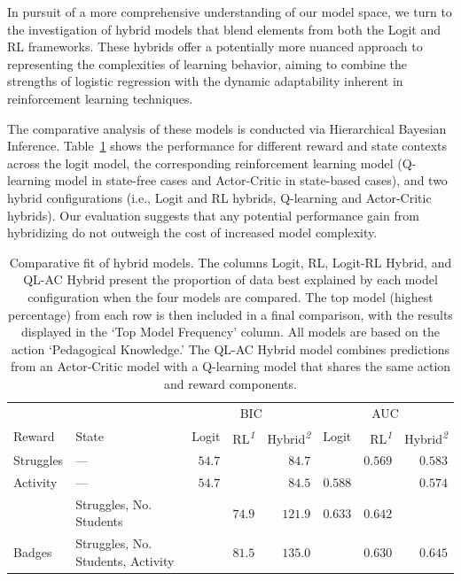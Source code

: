 \documentclass[
  number,
  preprint,
  3p,
  onecolumn]{elsarticle}
\begin{document}
In pursuit of a more comprehensive understanding of our model space, we
turn to the investigation of hybrid models that blend elements from both
the Logit and RL frameworks. These hybrids offer a potentially more
nuanced approach to representing the complexities of learning behavior,
aiming to combine the strengths of logistic regression with the dynamic
adaptability inherent in reinforcement learning techniques.

The comparative analysis of these models is conducted via Hierarchical
Bayesian Inference. Table~\ref{tbl-CBM-second} shows the performance for
different reward and state contexts across the logit model, the
corresponding reinforcement learning model (Q-learning model in
state-free cases and Actor-Critic in state-based cases), and two hybrid
configurations (i.e., Logit and RL hybrids, Q-learning and Actor-Critic
hybrids). Our evaluation suggests that any potential performance gain
from hybridizing do not outweigh the cost of increased model complexity.

\setlength{\LTpost}{0mm}

\begin{longtable}{l|lrrrrrr}

\caption{\label{tbl-CBM-second}Comparative fit of hybrid models. The
columns Logit, RL, Logit-RL Hybrid, and QL-AC Hybrid present the
proportion of data best explained by each model configuration when the
four models are compared. The top model (highest percentage) from each
row is then included in a final comparison, with the results displayed
in the `Top Model Frequency' column. All models are based on the action
`Pedagogical Knowledge.' The QL-AC Hybrid model combines predictions
from an Actor-Critic model with a Q-learning model that shares the same
action and reward components.}

\tabularnewline

\toprule
\multicolumn{1}{l}{} &  & \multicolumn{3}{c}{BIC} & \multicolumn{3}{c}{AUC} \\ 
\cmidrule(lr){3-5} \cmidrule(lr){6-8}
\multicolumn{1}{l}{Reward} & State & Logit & RL\textsuperscript{\textit{1}} & Hybrid\textsuperscript{\textit{2}} & Logit & RL\textsuperscript{\textit{1}} & Hybrid\textsuperscript{\textit{2}} \\ 
\midrule\addlinespace[2.5pt]
Struggles & — & $54.7$ & \cellcolor[HTML]{FFD92F}{$54.1$} & $84.7$ & \cellcolor[HTML]{FFD92F}{$0.600$} & $0.569$ & $0.583$ \\ 
\midrule\addlinespace[2.5pt]
Activity & — & $54.7$ & \cellcolor[HTML]{FFD92F}{$42.9$} & $84.5$ & $0.588$ & \cellcolor[HTML]{FFD92F}{$0.591$} & $0.574$ \\ 
 & Struggles, No. Students & \cellcolor[HTML]{FFD92F}{$65.3$} & $74.9$ & $121.9$ & $0.633$ & $0.642$ & \cellcolor[HTML]{FFD92F}{$0.665$} \\ 
\midrule\addlinespace[2.5pt]
Badges & Struggles, No. Students, Activity & \cellcolor[HTML]{FFD92F}{$71.6$} & $81.5$ & $135.0$ & \cellcolor[HTML]{FFD92F}{$0.658$} & $0.630$ & $0.645$ \\ 
\bottomrule

\end{longtable}
\end{document}
